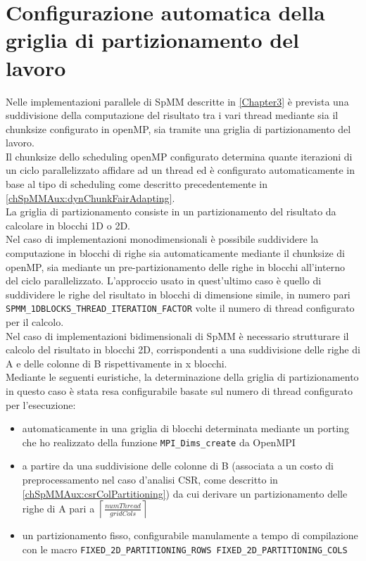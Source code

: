 \section{Configurazione automatica della griglia di partizionamento del lavoro}	\label{chSpMMAux:ompGrid}
Nelle implementazioni parallele di SpMM descritte in \ref{Chapter3} è prevista una suddivisione della computazione del risultato
tra i vari thread mediante sia il chunksize configurato in openMP, sia tramite una griglia di partizionamento del lavoro.\\
Il chunksize dello scheduling openMP configurato determina quante iterazioni di un ciclo parallelizzato affidare ad un thread
ed è configurato automaticamente in base al tipo di scheduling come descritto precedentemente in \ref{chSpMMAux:dynChunkFairAdapting}.\\
La griglia di partizionamento consiste in un partizionamento del risultato da calcolare in blocchi 1D o 2D.\\
\voidLine
Nel caso di implementazioni monodimensionali è possibile suddividere la computazione in blocchi di righe sia automaticamente 
mediante il chunksize di openMP, sia mediante un pre-partizionamento delle righe in blocchi all'interno del ciclo parallelizzato.
L'approccio usato in quest'ultimo caso è quello di suddividere le righe del risultato in blocchi di dimensione simile,
in numero pari \verb|SPMM_1DBLOCKS_THREAD_ITERATION_FACTOR| volte il numero di thread configurato per il calcolo.\\
Nel caso di implementazioni bidimensionali di SpMM è necessario strutturare il calcolo del risultato in blocchi 2D, corrispondenti
a una suddivisione delle righe di A e delle colonne di B rispettivamente in x blocchi.\\
Mediante le seguenti euristiche, la determinazione della griglia di partizionamento in questo caso è stata resa configurabile 
basate sul numero di thread configurato per l'esecuzione:\\
\begin{itemize}
	\item	automaticamente in una griglia di blocchi determinata mediante un porting che ho realizzato 
			della funzione \verb|MPI_Dims_create| da OpenMPI
	\item	a partire da una suddivisione delle colonne di B (associata a un costo di preprocessamento nel caso d'analisi CSR, come descritto in \ref{chSpMMAux:csrColPartitioning})
			da cui derivare un partizionamento delle righe di A pari a $\left\lceil \frac{numThread}{gridCols}  \right\rceil$
	\item	un partizionamento fisso, configurabile manulamente a tempo di compilazione con le macro
			\verb|FIXED_2D_PARTITIONING_ROWS FIXED_2D_PARTITIONING_COLS|
\end{itemize}
